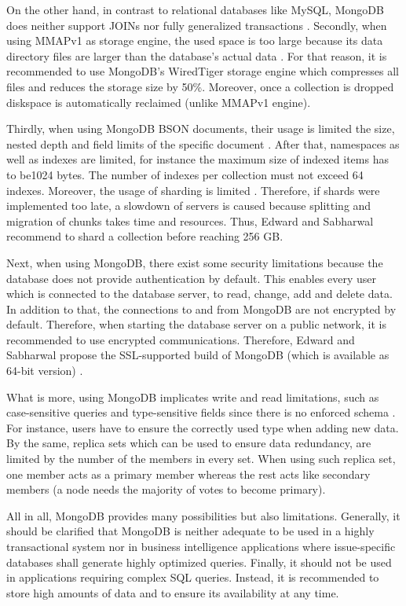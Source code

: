 On the other hand, in contrast to relational databases like MySQL, MongoDB does neither support JOINs nor fully generalized transactions \cite[p.25 ff.]{mongodb_edward}. Secondly, when using MMAPv1 as storage engine, the used space is too large because its data directory files are larger than the database's actual data \cite[p.226 ff.]{mongodb_edward}. For that reason, it is recommended to use MongoDB's WiredTiger storage engine which compresses all files and reduces the storage size by 50\%. Moreover, once a collection is dropped diskspace is automatically reclaimed (unlike MMAPv1 engine).

Thirdly, when using MongoDB BSON documents, their usage is limited the size, nested depth and field limits of the specific document \cite[p.228 ff.]{mongodb_edward}. After that, namespaces as well as indexes are limited, for instance the maximum size of indexed items has to be1024 bytes. The number of indexes per collection must not exceed 64 indexes. Moreover, the usage of sharding is limited \cite[p.230 ff.]{mongodb_edward}. Therefore, if shards were implemented too late, a slowdown of servers is caused because splitting and migration of chunks takes time and resources. Thus, Edward and Sabharwal  recommend to shard a collection before reaching 256 \ac{GB}. 

Next, when using MongoDB, there exist some security limitations because the database does not provide authentication by default. This enables every user which is connected to the database server, to read, change, add and delete data. In addition to that, the connections to and from MongoDB are not encrypted by default. Therefore, when starting the database server on a public network, it is recommended to use encrypted communications. Therefore, Edward and Sabharwal propose the SSL-supported build of MongoDB (which is available as 64-bit version) \cite[p.230 ff.]{mongodb_edward}. 

What is more, using MongoDB implicates write and read limitations, such as case-sensitive queries and type-sensitive fields since there is no enforced schema \cite[p.231 ff.]{mongodb_edward}. For instance, users have to ensure the correctly used type when adding new data. By the same, replica sets which can be used to ensure data redundancy, are limited by the number of the members in every set. When using such replica set, one member acts as a primary member whereas the rest acts like secondary members (a node needs the majority of votes to become primary).

All in all, MongoDB provides many possibilities but also limitations. Generally, it should be clarified that MongoDB is neither adequate to be used in a highly transactional system nor in business intelligence applications where issue-specific databases shall generate highly optimized queries. Finally, it should not be used in applications requiring complex SQL queries. Instead, it is recommended to store high amounts of data and to ensure its availability at any time. 

